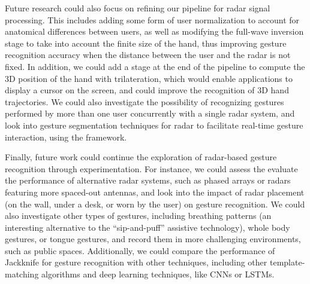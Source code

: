 Future research could also focus on refining our pipeline for radar signal processing.
%
This includes adding some form of user normalization to account for anatomical differences between users, as well as modifying the full-wave inversion stage to take into account the finite size of the hand, thus improving gesture recognition accuracy when the distance between the user and the radar is not fixed.
% 
In addition, we could add a stage at the end of the pipeline to compute the 3D position of the hand with trilateration, which would enable applications to display a cursor on the screen, and could improve the recognition of 3D hand trajectories.
% 
We could also investigate the possibility of recognizing gestures performed by more than one user concurrently with a single radar system, and look into gesture segmentation techniques for radar to facilitate real-time gesture interaction, \eg using the \ql framework.

Finally, future work could continue the exploration of radar-based gesture recognition through experimentation.
%
For instance, we could assess the evaluate the performance of alternative radar systems, such as phased arrays or radars featuring more spaced-out antennas, and look into the impact of radar placement (\eg on the wall, under a desk, or worn by the user) on gesture recognition.
%
We could also investigate other types of gestures, including breathing patterns (an interesting alternative to the ``sip-and-puff'' assistive technology), whole body gestures, or tongue gestures, and record them in more challenging environments, such as public spaces.
%
Additionally, we could compare the performance of Jackknife for gesture recognition with other techniques, including other template-matching algorithms and deep learning techniques, like CNNs or LSTMs.
